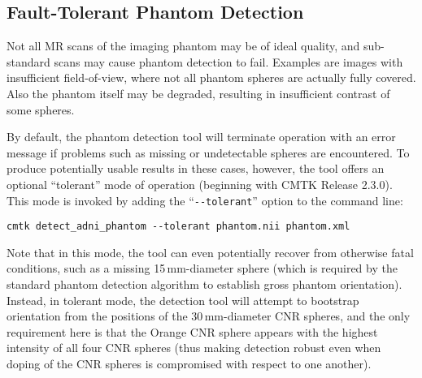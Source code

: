 \documentclass{InsightArticle}
\begin{document}
\subsection{Fault-Tolerant Phantom Detection}

Not all MR scans of the imaging phantom may be of ideal quality, and
sub-standard scans may cause phantom detection to fail. Examples are images
with insufficient field-of-view, where not all phantom spheres are actually
fully covered. Also the phantom itself may be degraded, resulting in
insufficient contrast of some spheres.

By default, the phantom detection tool will terminate operation with an error
message if problems such as missing or undetectable spheres are
encountered. To produce potentially usable results in these cases, however,
the tool offers an optional ``tolerant'' mode of operation (beginning with
CMTK Release 2.3.0). This mode is invoked by adding the
``\verb|--tolerant|'' option to the command line:
\begin{verbatim}
cmtk detect_adni_phantom --tolerant phantom.nii phantom.xml
\end{verbatim}
Note that in this mode, the tool can even potentially recover from otherwise
fatal conditions, such as a missing 15\,mm-diameter sphere (which is required
by the standard phantom detection algorithm to establish gross phantom
orientation). Instead, in tolerant mode, the detection tool will attempt to
bootstrap orientation from the positions of the 30\,mm-diameter CNR spheres,
and the only requirement here is that the Orange CNR sphere appears with the
highest intensity of all four CNR spheres (thus making detection robust even
when doping of the CNR spheres is compromised with respect to one another).
\end{document}
